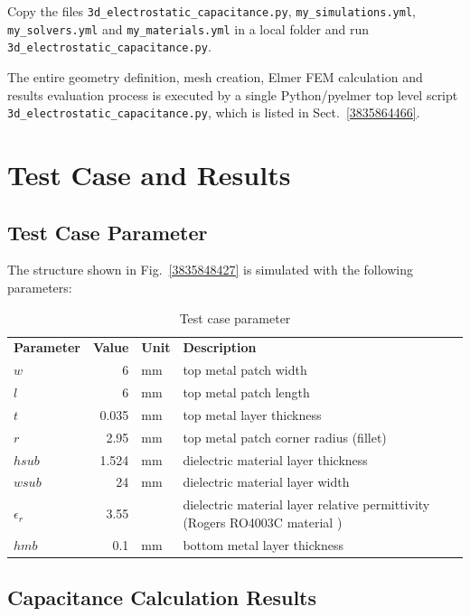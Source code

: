 \documentclass[10pt,a4paper,titlepage]{article}
\newcommand{\fig}[1]{Fig.~\ref{#1}}
\newcommand{\sect}[1]{Sect.~\ref{#1}}
\begin{document}
	Copy the files \verb|3d_electrostatic_capacitance.py|, \verb|my_simulations.yml|, \verb|my_solvers.yml| and \verb|my_materials.yml| in a local folder and run \verb|3d_electrostatic_capacitance.py|.
	
	The entire geometry definition, mesh creation, Elmer FEM calculation and results evaluation process is executed by a single Python/pyelmer top level script \verb|3d_electrostatic_capacitance.py|, which is listed in \sect{3835864466}.
	
	
	
	
	\section{Test Case and Results}
	
	\subsection{Test Case Parameter}
	
	The structure shown in \fig{3835848427} is simulated with the following parameters:
	
	\begin{table}[H]
		\centering
		\begin{tabular}{lrll}
			\bf Parameter & \bf Value & \bf Unit  & \bf Description \\
			$w$ & 6 & \si{\milli\meter}	& top metal patch width \\
			$l$ & 6 & \si{\milli\meter}	& top metal patch length \\
			$t$ & 0.035 & \si{\milli\meter}	& top metal layer thickness \\
			$r$ & 2.95 & \si{\milli\meter}	& top metal patch corner radius (fillet) \\
			$hsub$ & 1.524 & \si{\milli\meter}	& dielectric material layer thickness \\
			$wsub$ & 24 & \si{\milli\meter}	& dielectric material layer width\\
			$\epsilon_r$ & 3.55 & 	& dielectric material layer relative permittivity (Rogers RO4003C material \cite{RO4003C})\\
			$hmb$ & 0.1 & \si{\milli\meter}	& bottom metal layer thickness \\
		\end{tabular}
		\caption{Test case parameter}
	\end{table}
	
	\subsection{Capacitance Calculation Results}
	
\end{document}
